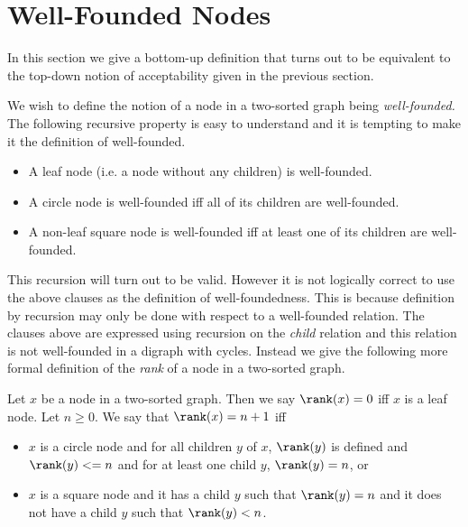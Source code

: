 \documentclass[oneside,12pt]{amsart}
\begin{document}

\section{Well-Founded Nodes}

In this section we give a bottom-up definition that turns out to be equivalent to the top-down
notion of acceptability given in the previous section.

We wish to define the notion of a node in a two-sorted graph being \emph{well-founded.} The following recursive property
is easy to understand and it is tempting to make it the definition of well-founded.

\begin{itemize}
\item A leaf node (i.e. a node without any children) is well-founded.
\item A circle node is well-founded iff all of its children are well-founded.
\item A non-leaf square node is well-founded iff at least one of its children are well-founded.
\end{itemize}

This recursion will turn out to be valid. However it is not logically correct to use the above clauses as the
definition of well-foundedness. This is because definition by recursion may only be done with respect to
a well-founded relation. The clauses above are expressed using recursion on the \emph{child} relation and this
relation is not well-founded in a digraph with cycles. Instead we give the following more formal definition
of the \emph{rank} of a node in a two-sorted graph.

\begin{definition}
Let $x$ be a node in a two-sorted graph. Then we say $\rank(x) = 0$ iff $x$ is a leaf node.
Let $n\geq 0$. We say that $\rank(x) = n+1$ iff
\begin{itemize}
\item $x$ is a circle node and for all children $y$ of $x$, $\rank(y)$ is defined and $\rank(y) <= n$ and for at least one child
$y$, $\rank(y)=n$, or
\item $x$ is a square node and it has a child $y$ such that $\rank(y) = n$ and it does not have a child
$y$ such that $\rank(y) < n$.
\end{itemize}
\end{definition}
\end{document}
